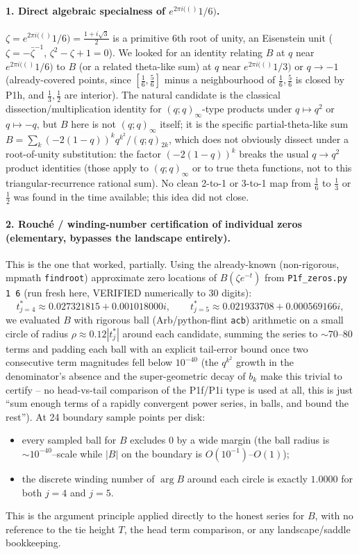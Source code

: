 \documentclass[11pt]{article}
\newcommand{\e}[1]{e^{2\pi i(#1)}}
\begin{document}
\paragraph{1. Direct algebraic specialness of $\e(1/6)$.} $\zeta=\e(1/6)=\tfrac{1+i\sqrt3}2$ is a primitive 6th root of unity, an Eisenstein unit ($\zeta=-\bar\zeta^{-1}$, $\zeta^2-\zeta+1=0$). We looked for an identity relating $B$ at $q$ near $\e(1/6)$ to $B$ (or a related theta-like sum) at $q$ near $\e(1/3)$ or $q\to-1$ (already-covered points, since $[\frac16,\frac56]$ minus a neighbourhood of $\frac16,\frac56$ is closed by P1h, and $\frac13,\frac12$ are interior). The natural candidate is the classical dissection/multiplication identity for $(q;q)_\infty$-type products under $q\mapsto q^2$ or $q\mapsto -q$, but $B$ here is not $(q;q)_\infty$ itself; it is the specific partial-theta-like sum $B=\sum_k(-2(1-q))^kq^{k^2}/(q;q)_{2k}$, which does not obviously dissect under a root-of-unity substitution: the factor $(-2(1-q))^k$ breaks the usual $q\to q^2$ product identities (those apply to $(q;q)_\infty$ or to true theta functions, not to this triangular-recurrence rational sum). No clean 2-to-1 or 3-to-1 map from $\frac16$ to $\frac13$ or $\frac12$ was found in the time available; this idea did not close.

\paragraph{2. Rouch\'e / winding-number certification of individual zeros (elementary, bypasses the landscape entirely).} This is the one that worked, partially. Using the already-known (non-rigorous, mpmath \texttt{findroot}) approximate zero locations of $B(\zeta e^{-t})$ from \texttt{P1f\_zeros.py 1 6} (run fresh here, VERIFIED numerically to 30 digits):
\[
t^*_{j=4}\approx 0.027321815+0.001018000i,\qquad t^*_{j=5}\approx 0.021933708+0.000569166i,
\]
we evaluated $B$ with rigorous ball (Arb/python-flint \texttt{acb}) arithmetic on a small circle of radius $\rho\approx0.12|t^*_j|$ around each candidate, summing the series to $\sim70$--$80$ terms and padding each ball with an explicit tail-error bound once two consecutive term magnitudes fell below $10^{-40}$ (the $q^{k^2}$ growth in the denominator's absence and the super-geometric decay of $b_k$ make this trivial to certify -- no head-vs-tail comparison of the P1f/P1i type is used at all, this is just ``sum enough terms of a rapidly convergent power series, in balls, and bound the rest''). At 24 boundary sample points per disk:
\begin{itemize}
\item every sampled ball for $B$ excludes $0$ by a wide margin (the ball radius is $\sim10^{-40}$--scale while $|B|$ on the boundary is $O(10^{-1})$--$O(1)$);
\item the discrete winding number of $\arg B$ around each circle is exactly $1.0000$ for both $j=4$ and $j=5$.
\end{itemize}
This is the argument principle applied directly to the honest series for $B$, with no reference to the tie height $T$, the head term comparison, or any landscape/saddle bookkeeping.
\end{document}
